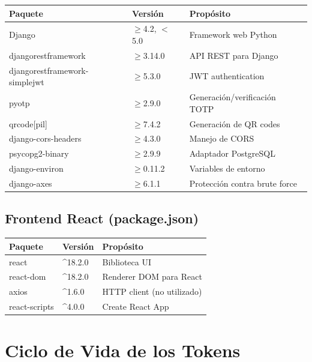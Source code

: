 \documentclass[12pt,a4paper,openany]{article}
\begin{document}
\begin{table}[H]
\centering
\begin{tabular}{@{}lll@{}}
\toprule
\textbf{Paquete} & \textbf{Versión} & \textbf{Propósito} \\
\midrule
Django & $\geq$4.2, $<$5.0 & Framework web Python \\
djangorestframework & $\geq$3.14.0 & API REST para Django \\
djangorestframework-simplejwt & $\geq$5.3.0 & JWT authentication \\
pyotp & $\geq$2.9.0 & Generación/verificación TOTP \\
qrcode[pil] & $\geq$7.4.2 & Generación de QR codes \\
django-cors-headers & $\geq$4.3.0 & Manejo de CORS \\
psycopg2-binary & $\geq$2.9.9 & Adaptador PostgreSQL \\
django-environ & $\geq$0.11.2 & Variables de entorno \\
django-axes & $\geq$6.1.1 & Protección contra brute force \\
\bottomrule
\end{tabular}
\end{table}

\subsection{Frontend React (package.json)}

\begin{table}[H]
\centering
\begin{tabular}{@{}lll@{}}
\toprule
\textbf{Paquete} & \textbf{Versión} & \textbf{Propósito} \\
\midrule
react & \textasciicircum18.2.0 & Biblioteca UI \\
react-dom & \textasciicircum18.2.0 & Renderer DOM para React \\
axios & \textasciicircum1.6.0 & HTTP client (no utilizado) \\
react-scripts & \textasciicircum4.0.0 & Create React App \\
\bottomrule
\end{tabular}
\end{table}

\section{Ciclo de Vida de los Tokens}
\end{document}
